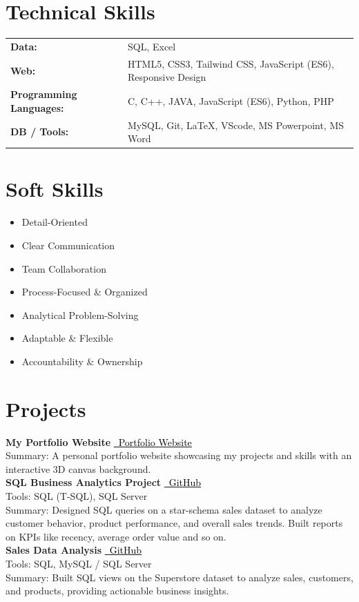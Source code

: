 \documentclass[a4paper,10pt]{article}
\newcommand{\githubbutton}[2]{%
  \colorbox{gray!20}{\href{#1}{\textcolor{black}{\faGithub\ #2}}}%
}
\newcommand{\portfoliobutton}[2]{%
  \colorbox{gray!20}{\href{#1}{\textcolor{black}{\faGlobe\ #2}}}%
}
\newcommand{\cvsection}[2]{%
  \section*{\textcolor{blue!50!black}{#1}}\label{#2}%
  \vspace{4pt}%
}
\begin{document}
\cvsection{Technical Skills}{sec:skills}
\begin{tabular}{p{3.3cm} p{12cm}}
\textbf{Data:} & SQL, Excel \\
\textbf{Web:} & HTML5, CSS3, Tailwind CSS, JavaScript (ES6), Responsive Design \\
\textbf{Programming Languages:} & C, C++, JAVA, JavaScript (ES6), Python, PHP \\
\textbf{DB / Tools:} & MySQL, Git, LaTeX, VScode, MS Powerpoint, MS Word \\
\end{tabular}

\cvsection{Soft Skills}{sec:softskills}
\begin{itemize}[label={\faCheckCircle}]
  \item Detail-Oriented  
  \item Clear Communication  
  \item Team Collaboration  
  \item Process-Focused \& Organized  
  \item Analytical Problem-Solving  
  \item Adaptable \& Flexible  
  \item Accountability \& Ownership  
\end{itemize}

\cvsection{Projects}{sec:projects}
\textbf{My Portfolio Website} 
\portfoliobutton{https://nuzmols-3d-canvas.lovable.app}{Portfolio Website} \\
Summary: A personal portfolio website showcasing my projects and skills with an interactive 3D canvas background. \\

\vspace{4pt}
\textbf{SQL Business Analytics Project} 
\githubbutton{https://github.com/Nuzmolkhan/sql-sales-customer-product-insights}{GitHub} \\
Tools: SQL (T-SQL), SQL Server \\
Summary: Designed SQL queries on a star-schema sales dataset to analyze customer behavior, product performance, and overall sales trends. Built reports on KPIs like recency, average order value and so on. \\

\vspace{4pt}
\textbf{Sales Data Analysis} 
\githubbutton{https://github.com/Nuzmolkhan/sales_data_analysis}{GitHub} \\
Tools: SQL, MySQL / SQL Server \\
Summary: Built SQL views on the Superstore dataset to analyze sales, customers, and products, providing actionable business insights. \\
\end{document}
